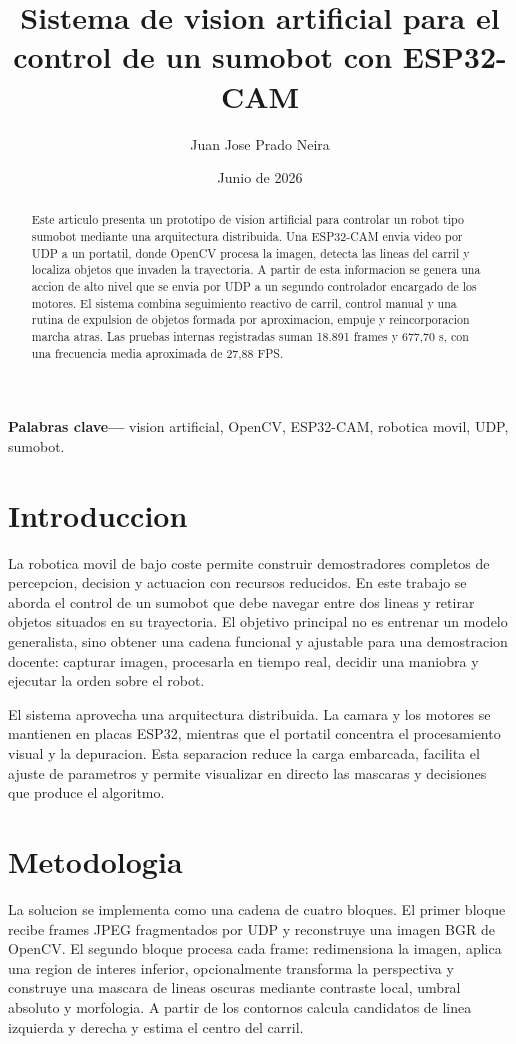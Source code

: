 \documentclass[10pt,a4paper,twocolumn]{article}
\title{\textbf{Sistema de vision artificial para el control de un sumobot con ESP32-CAM}}
\author{Juan Jose Prado Neira}
\date{Junio de 2026}
\begin{document}
\maketitle

\begin{abstract}
Este articulo presenta un prototipo de vision artificial para controlar un
robot tipo sumobot mediante una arquitectura distribuida. Una ESP32-CAM envia
video por UDP a un portatil, donde OpenCV procesa la imagen, detecta las lineas
del carril y localiza objetos que invaden la trayectoria. A partir de esta
informacion se genera una accion de alto nivel que se envia por UDP a un segundo
controlador encargado de los motores. El sistema combina seguimiento reactivo
de carril, control manual y una rutina de expulsion de objetos formada por
aproximacion, empuje y reincorporacion marcha atras. Las pruebas internas
registradas suman 18.891 frames y 677,70 s, con una frecuencia media aproximada
de 27,88 FPS.
\end{abstract}

\noindent\textbf{Palabras clave---} vision artificial, OpenCV, ESP32-CAM,
robotica movil, UDP, sumobot.

\section{Introduccion}

La robotica movil de bajo coste permite construir demostradores completos de
percepcion, decision y actuacion con recursos reducidos. En este trabajo se
aborda el control de un sumobot que debe navegar entre dos lineas y retirar
objetos situados en su trayectoria. El objetivo principal no es entrenar un
modelo generalista, sino obtener una cadena funcional y ajustable para una
demostracion docente: capturar imagen, procesarla en tiempo real, decidir una
maniobra y ejecutar la orden sobre el robot.

El sistema aprovecha una arquitectura distribuida. La camara y los motores se
mantienen en placas ESP32, mientras que el portatil concentra el procesamiento
visual y la depuracion. Esta separacion reduce la carga embarcada, facilita el
ajuste de parametros y permite visualizar en directo las mascaras y decisiones
que produce el algoritmo.

\section{Metodologia}

La solucion se implementa como una cadena de cuatro bloques. El primer bloque
recibe frames JPEG fragmentados por UDP y reconstruye una imagen BGR de OpenCV.
El segundo bloque procesa cada frame: redimensiona la imagen, aplica una region
de interes inferior, opcionalmente transforma la perspectiva y construye una
mascara de lineas oscuras mediante contraste local, umbral absoluto y
morfologia. A partir de los contornos calcula candidatos de linea izquierda y
derecha y estima el centro del carril.
\end{document}
